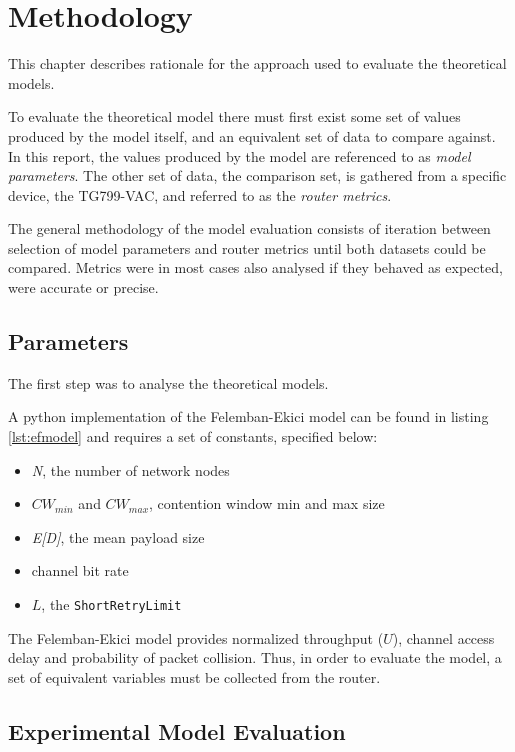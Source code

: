 \chapter{Methodology}

This chapter describes rationale for the approach used to evaluate the theoretical models.

To evaluate the theoretical model there must first exist some set of values produced by the model itself, and an equivalent set of data to compare against. In this report, the values produced by the model are referenced to as \emph{model parameters}. The other set of data, the comparison set, is gathered from a specific device, the TG799-VAC, and referred to as the \emph{router metrics}.

The general methodology of the model evaluation consists of iteration between selection of model parameters and router metrics until both datasets could be compared. Metrics were in most cases also analysed if they behaved as expected, were accurate or precise.

\section{Parameters}
The first step was to analyse the theoretical models.

A python implementation of the Felemban-Ekici model can be found in listing \ref{lst:efmodel} and requires a set of constants, specified below:

\begin{itemize}
	\item \emph{N}, the number of network nodes
	\item $CW_{min}$ and $CW_{max}$, contention window min and max size
	\item \emph{E[D]}, the mean payload size
	\item channel bit rate
	\item $L$, the \texttt{ShortRetryLimit}
\end{itemize}

The Felemban-Ekici model provides normalized throughput ($U$), channel access delay and probability of packet collision. Thus, in order to evaluate the model, a set of equivalent variables must be collected from the router.

\section{Experimental Model Evaluation}


